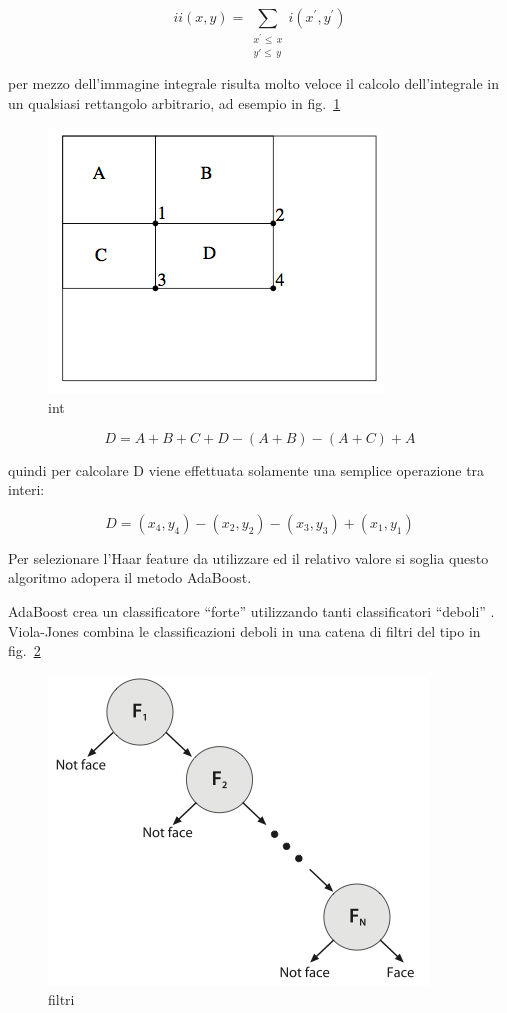 \documentclass[a4paper,11pt]{article}
\begin{document}
\[
ii(x,y) = \sum_{\substack{x^{'}\leq\,x\\ y'\leq\, y}} i(x^{'},y^{'})
\]

per mezzo dell'immagine integrale risulta molto veloce il calcolo
dell'integrale in un qualsiasi rettangolo arbitrario, ad esempio in
fig.~\ref{fig:int}

\begin{figure}[htbp]
  \centering
  \includegraphics[scale=0.5]{int}
  \caption{int}
  \label{fig:int}
\end{figure}

\[ 
D = A+B+C+D - (A+B) - (A+C) +A 
\]

quindi per calcolare D viene effettuata solamente una semplice
operazione tra interi:

\[
D = (x_{4},y_{4}) - (x_{2},y_{2}) - (x_{3}, y_{3}) + (x_{1}, y_{1})
\]

Per selezionare l'Haar feature da utilizzare ed il relativo valore si
soglia questo algoritmo adopera il metodo AdaBoost. 

AdaBoost crea un classificatore ``forte'' utilizzando tanti
classificatori ``deboli'' . Viola-Jones combina le classificazioni
deboli in una catena di filtri del tipo in fig.~\ref{fig:filtri}

\begin{figure}[htbp]
  \centering
  \includegraphics[scale=0.5]{filtri}
  \caption{filtri}
  \label{fig:filtri}
\end{figure}
\end{document}
